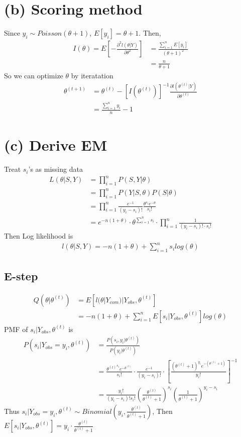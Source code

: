 \documentclass[11pt]{article}
\begin{document}
\section*{(b) Scoring method}
Since $y_i \sim Poisson(\theta +1)$, $E[y_i] = \theta + 1$. Then, 
\begin{align*}
I(\theta) = E\left[- \frac{\partial^2 l(\theta|Y)}{\partial \theta^2}\right] & =\frac{\sum_{i=1}^{n}E[y_i]}{(\theta + 1)^2}\\
&=\frac{n}{\theta + 1}
\end{align*}
So we can optimize $\theta$ by iteratation
\begin{align*}
\theta^{(t+1)} &= \theta^{(t)} - \left[ I(\theta^{(t)})\right]^{-1} \frac{\partial l(\theta^{(t)} | Y)}{\partial \theta^{(t)}}\\
&= \frac{\sum_{i=1}^{n}y_i}{n} -1
\end{align*}
\section*{(c) Derive EM}
Treat $s_i$'s as missing data
\begin{align*}
L(\theta | S, Y) & = \prod_{i=1}^{n}P(S,Y|\theta)\\
&=\prod_{i=1}^{n} P(Y|S,\theta) P(S|\theta) \\
&=\prod_{i=1}^{n}\frac{e^{-1}}{(y_i-s_i)!} \frac{\theta^{s_i}e^{-\theta}}{s_i!}\\
&= e^{-n(1+\theta)} \cdot \theta^{\sum_{i=1}^{n}s_i} \cdot \prod_{i=1}^{n}\frac{1}{(y_i-s_i)! \cdot s_i!}
\end{align*}
Then Log likelihood is
\begin{align*}
l(\theta | S,Y) = -n(1+\theta) + \sum_{i=1}^{n} s_i log(\theta)
\end{align*}
\subsection{E-step}
\begin{align*}
Q(\theta| \theta^{(t)}) &= E [l(\theta | Y_{com})| Y_{obs}, \theta^{(t)}]\\
&=-n(1+\theta) + \sum_{i=1}^{n} E[s_i| Y_{obs}, \theta^{(t)}] log(\theta)
\end{align*}
PMF of $s_i|Y_{obs},\theta^{(t)}$ is
\begin{align*}
P(s_i|Y_{obs}=y_i,\theta^{(t)}) &= \frac{P(s_i,y_i|\theta^{(t)})}{P(y_i|\theta^{(t)})}\\
&= \frac{{\theta^{(t)}}^{s_i} e^{-\theta^{(t)}}}{s_i!} \cdot \frac{e^{-1}}{(y_i-s_i)!} \cdot \left[ \frac{(\theta^{(t)}+1)^{y_i} e ^{-(\theta^{(t)} + 1)}}{y_i !}\right]^{-1}\\
&= \frac{y_i!}{(y_i-s_i)!s_i!} \left(\frac{\theta^{(t)}}{\theta^{(t)} +1}\right)^{s_i} \left(\frac{1}{\theta^{(t)} +1}\right)^{y_i - s_i}
\end{align*}
Thus $s_i|Y_{obs}=y_i,\theta^{(t)} \sim Binomial\left(y_i,\frac{\theta^{(t)}}{\theta^{(t)} + 1}\right)$, Then $E[s_i| Y_{obs}, \theta^{(t)}]= y_i\cdot\frac{\theta^{(t)}}{\theta^{(t)} + 1}$
\end{document}
